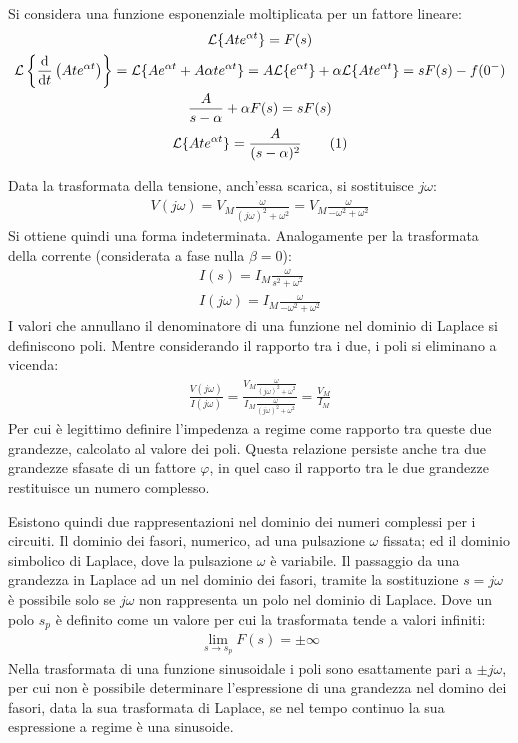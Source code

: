 \documentclass{article}
\newcommand{\df}{\mathrm{d}}
\newcommand{\tageq}{\tag{\stepcounter{equation}\theequation}}
\numberwithin{equation}{subsection}
\begin{document}
Si considera una funzione esponenziale moltiplicata per un fattore lineare:
\begin{gather*}
    \mathcal{L}\{Ate^{\alpha t}\}=F(s)\\
    \mathcal{L}\left\{\displaystyle\frac{\df}{\df t}\left(Ate^{\alpha t}\right)\right\}=\mathcal{L}\{Ae^{\alpha t}+A\alpha te^{\alpha t}\}=A\mathcal{L}\{e^{\alpha t}\}+\alpha\mathcal{L}\{Ate^{\alpha t}\}=sF(s)-f(0^-)\\
    \displaystyle\frac{A}{s-\alpha}+\alpha F(s)=sF(s)\\
    \mathcal{L}\{Ate^{\alpha t}\}=\frac{A}{(s-\alpha)^2}\tageq
\end{gather*}

Data la trasformata della tensione, anch'essa scarica, si sostituisce $j\omega$:
\begin{gather*}
    V(j\omega)=V_M\displaystyle\frac{\omega}{(j\omega)^2+\omega^2}=V_M\frac{\omega}{-\omega^2+\omega^2}
\end{gather*}
Si ottiene quindi una forma indeterminata. Analogamente per la trasformata della corrente (considerata a fase nulla $\beta=0$): 
\begin{gather*}
    I(s)=\displaystyle I_M\frac{\omega}{s^2+\omega^2}\\
    I(j\omega)=\displaystyle {I_M}\frac{\omega}{-\omega^2+\omega^2}
\end{gather*}
I valori che annullano il denominatore di una funzione nel dominio di Laplace si definiscono poli. Mentre considerando il rapporto tra i due, i poli si eliminano a vicenda:
\begin{gather*}
    \displaystyle\frac{V(j\omega)}{I(j\omega)}=\displaystyle\frac{V_M\displaystyle\frac{\omega}{(j\omega)^2+\omega^2}}{I_M\displaystyle\frac{\omega}{(j\omega)^2+\omega^2}}=\frac{V_M}{I_M}
\end{gather*}
Per cui è legittimo definire l'impedenza a regime come rapporto tra queste due grandezze, calcolato al valore dei poli. Questa relazione persiste anche tra due grandezze 
sfasate di un fattore $\varphi$, in quel caso il rapporto tra le due grandezze restituisce un numero complesso. 


Esistono quindi due rappresentazioni nel dominio dei numeri complessi per i circuiti. Il dominio dei fasori, numerico, ad una pulsazione $\omega$ fissata; ed il dominio 
simbolico di Laplace, dove la pulsazione $\omega$ è variabile. Il passaggio da una grandezza in Laplace ad un nel dominio dei fasori, tramite la sostituzione $s=j\omega$ è 
possibile solo se $j\omega$ non rappresenta un polo nel dominio di Laplace. Dove un polo $s_p$ è definito come un valore per cui la trasformata tende a valori infiniti:
\begin{gather*}
    \lim_{s\to s_p}F(s)=\pm\infty
\end{gather*}
Nella trasformata di una funzione sinusoidale i poli sono esattamente pari a $\pm j\omega$, per cui non è possibile determinare l'espressione di una grandezza nel domino 
dei fasori, data la sua trasformata di Laplace, se nel tempo continuo la sua espressione a regime è una sinusoide. 
\end{document}
